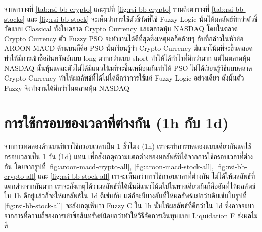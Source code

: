 จากตารางที่ \ref{tab:rsi-bb-crypto} และรูปที่ \ref{fig:rsi-bb-crypto} รวมถึงตารางที่ \ref{tab:rsi-bb-stocks} และ \ref{fig:rsi-bb-stock} จะเห็นว่าการใช้ตัวชี้วัดที่ใช้ Fuzzy Logic นั้นให้ผลลัพธ์ที่กว่าตัวชี้วัดแบบ Classical ทั้งในตลาด Crypto Currency และตลาดหุ้น NASDAQ โดยในตลาด Crypto Currency ตัว Fuzzy PSO จะทำงานได้ดีที่สุดซึ่งเหตุผลก็คล้ายๆ กับที่กล่าวในหัวข้อ AROON-MACD ด้านบนก็คือ PSO นั้นเรียนรู้ว่า Crypto Currency มีแนวโน้มที่จะขึ้นตลอด ทำให้มีการเข้าซื้อสินทรัพย์แบบ long มากกว่าแบบ short ทำให้ได้กำไรที่ดีกว่ามาก แต่ในตลาดหุ้น NASDAQ นั้นหุ้นแต่ละตัวไม่ได้มีแนวโน้มที่จะขึ้นเหมือนกันทำให้ PSO ไม่ได้เรียนรู้วิธีแบบตลาด Crypto Currency ทำให้ผลลัพธ์ที่ได้ไม่ได้ดีกว่าการใช้แค่ Fuzzy Logic อย่างเดียว ดังนั้นตัว Fuzzy จึงทำงานได้ดีกว่าในตลาดหุ่้น NASDAQ

\section{การใช้กรอบของเวลาที่ต่างกัน (1h กับ 1d)}
จากการทดลองด้านบนที่เราใช้กรอบเวลาเป็น 1 ชั่วโมง (1h) เราจะทำการทดลองแบบเดียวกันแต่ใช้กรอบเวลาเป็น 1 วัน (1d) แทน เพื่อสังเกตุความแตกต่างของผลลัพธ์ที่ได้จากการใช้กรอบเวลาที่ต่างกัน โดยจากรูปที่ \ref{fig:aroon-macd-crypto-all}, \ref{fig:aroon-macd-stock-all}, \ref{fig:rsi-bb-crypto-all} และ \ref{fig:rsi-bb-stock-all} เราจะเห็นกว่าการใช้กรอบเวลาที่ต่างกัน ไม่ได้ให้ผลลัพธ์ที่แตกต่างจากกันมาก เราจะสังเกตุได้ว่าผลลัพธ์ที่ได้นั้นมีแนวโน้มไปในทางเดียวกันก็คืออันที่ให้ผลลัพธ์ใน 1h ดีอยู่แล้วก็จะให้ผลลัพธ์ใน 1d ดีเช่นกัน แต่ก็จะมีบางอันที่ให้ผลลัพธ์แย่กว่าเดิมเช่นในรูปที่ \ref{fig:rsi-bb-stock-all} จะสังเกตุเห็นว่า Fuzzy C ใน 1h นั้นให้ผลลัพธ์ที่ดีกว่าใน 1d ซึ่งอาจจะมาจากการที่ความถี่ของการเข้าซื้อสินทรัพย์น้อยกว่าทำให้วิธีจัดการเงินทุนแบบ Liquidation F ส่งผลไม่ดี

